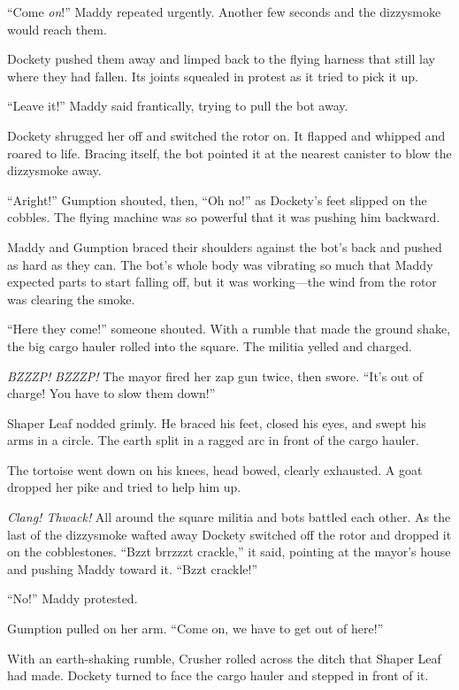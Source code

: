 \documentclass[10pt]{article}
\begin{document}
``Come \emph{on}!'' Maddy repeated urgently. Another few seconds and the
dizzysmoke would reach them.

Dockety pushed them away and limped back to the flying harness that
still lay where they had fallen. Its joints squealed in protest as it
tried to pick it up.

``Leave it!'' Maddy said frantically, trying to pull the bot away.

Dockety shrugged her off and switched the rotor on. It flapped and
whipped and roared to life. Bracing itself, the bot pointed it at the
nearest canister to blow the dizzysmoke away.

``Aright!'' Gumption shouted, then, ``Oh no!'' as Dockety's feet slipped
on the cobbles. The flying machine was so powerful that it was pushing
him backward.

Maddy and Gumption braced their shoulders against the bot's back and
pushed as hard as they can. The bot's whole body was vibrating so much
that Maddy expected parts to start falling off, but it was working---the
wind from the rotor was clearing the smoke.

``Here they come!'' someone shouted. With a rumble that made the ground
shake, the big cargo hauler rolled into the square. The militia yelled
and charged.

\emph{BZZZP!} \emph{BZZZP!} The mayor fired her zap gun twice, then
swore. ``It's out of charge! You have to slow them down!''

Shaper Leaf nodded grimly. He braced his feet, closed his eyes, and
swept his arms in a circle. The earth split in a ragged arc in front of
the cargo hauler.

The tortoise went down on his knees, head bowed, clearly exhausted. A
goat dropped her pike and tried to help him up.

\emph{Clang! Thwack!} All around the square militia and bots battled
each other. As the last of the dizzysmoke wafted away Dockety switched
off the rotor and dropped it on the cobblestones. ``Bzzt brrzzzt
crackle,'' it said, pointing at the mayor's house and pushing Maddy
toward it. ``Bzzt crackle!''

``No!'' Maddy protested.

Gumption pulled on her arm. ``Come on, we have to get out of here!''

With an earth-shaking rumble, Crusher rolled across the ditch that
Shaper Leaf had made. Dockety turned to face the cargo hauler and
stepped in front of it.
\end{document}
